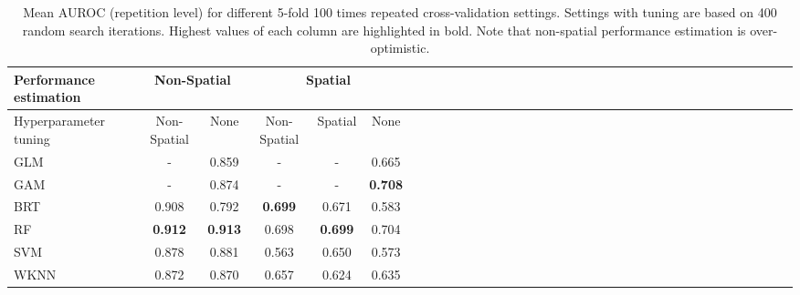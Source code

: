 \documentclass[review]{elsarticle}
\begin{document}
\begin{table} [t!]
	\centering
	\caption[]{Mean \ac{AUROC} (repetition level) for different 5-fold 100 times repeated cross-validation settings.
		Settings with tuning are based on 400 random search iterations.
		Highest values of each column are highlighted in bold.
		Note that non-spatial performance estimation is over-optimistic.}
	\begin{adjustbox}{max width=\textwidth}
		\begin{tabular}{*{6}{l|c|c|c|c|c|}}
			Performance estimation & \multicolumn{2}{c|}{Non-Spatial} & \multicolumn{3}{c|}{Spatial}                                         \\
			\toprule
			Hyperparameter tuning  & Non-Spatial                      & None                         & Non-Spatial & Spatial    & None       \\
			\midrule
			GLM                    & -                                & 0.859                        & -           & -          & 0.665      \\
			GAM                    & -                                & 0.874                        & -           & -          & \bf{0.708} \\
			BRT                    & 0.908                            & 0.792                        & \bf{0.699}  & 0.671      & 0.583      \\
			RF                     & \bf{0.912}                       & \bf{0.913}                   & 0.698       & \bf{0.699} & 0.704      \\
			SVM                    & 0.878                            & 0.881                        & 0.563       & 0.650      & 0.573      \\
			WKNN                   & 0.872                            & 0.870                        & 0.657       & 0.624      & 0.635      \\
		\end{tabular}
	\end{adjustbox}
	\label{table:auroc_estimates}
\end{table}
\end{document}
